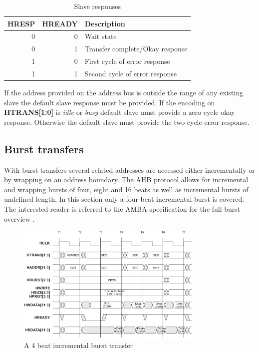 \begin{table}[hbt]
  \label{tab:hsize}
  \begin{tabular}{|r|r|p{10cm}|} 
  \hline
  \textbf{HRESP} & \textbf{HREADY} & \textbf{Description} \\
    \hline
  0 & 0 & Wait state\\
    \hline
  0 & 1 & Transfer complete/Okay response \\
    \hline
  1 & 0 & First cycle of error response\\
    \hline
  1 & 1 & Second cycle of error response \\
\hline
  \end{tabular}
\caption{Slave responses}
\end{table}

If the address provided on the address bus is outside the range of any existing slave the default slave response must be provided. If the encoding on \textbf{HTRANS[1:0]} is \textit{idle} or \textit{busy} default slave must provide a zero cycle okay response. Otherwise the default slave must provide the two cycle error response. 

\subsection{Burst transfers}
With burst transfers several related addresses are accessed either incrementally or by wrapping on an address boundary. The AHB protocol allows for incremental
 and wrapping bursts of four, eight and 16 beats as well as incremental bursts of undefined length. In this section only a four-beat incremental burst is covered. The interested reader is referred to the AMBA specification for the full burst overview \cite{amba}.

\begin{figure}[hbt]
    \begin{center}
        \includegraphics[width=0.8\textwidth]{figs/AHB/burst.png}
    \end{center}
    \caption{A 4 beat incremental burst transfer}
    \label{fig:burst}
\end{figure}

